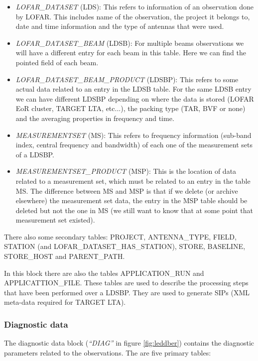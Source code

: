 \documentclass[a4paper,11pt]{article}
\begin{document}
\begin{itemize}
	\item \textit{LOFAR\_DATASET} (LDS): This refers to information of an observation done by LOFAR. This includes name of the observation, the project it belongs to, date and time information and the type of antennas that were used.
	
	\item \textit{LOFAR\_DATASET\_BEAM} (LDSB): For multiple beams observations we will have a different entry for each beam in this table. Here we can find the pointed field of each beam.
	
	\item \textit{LOFAR\_DATASET\_BEAM\_PRODUCT} (LDSBP): This refers to some actual data related to an entry in the LDSB table. For the same LDSB entry we can have different LDSBP depending on where the data is stored (LOFAR EoR cluster, TARGET LTA, etc...), the packing type (TAR, BVF or none) and the averaging properties in frequency and time.
	
	\item \textit{MEASUREMENTSET} (MS): This refers to frequency information (sub-band index, central frequency and bandwidth) of each one of the measurement sets of a LDSBP.
	
	\item \textit{MEASUREMENTSET\_PRODUCT} (MSP): This is the location of data related to a measurement set, which must be related to an entry in the table MS. The difference between MS and MSP is that if we delete (or archive elsewhere) the measurement set data, the entry in the MSP table should be deleted but not the one in MS (we still want to know that at some point that measurement set existed). 
\end{itemize}

There also some secondary tables: PROJECT, ANTENNA\_TYPE, FIELD, STATION (and LOFAR\_DATASET\_HAS\_STATION), STORE, BASELINE, STORE\_HOST and PARENT\_PATH.

In this block there are also the tables APPLICATION\_RUN and APPLICATTION\_FILE. These tables are used to describe the processing steps that have been performed over a LDSBP. They are used to generate SIPs (XML meta-data required for TARGET LTA).

\subsubsection{Diagnostic data}
\label{sec:diag}

The diagnostic data block (\textit{``DIAG''} in figure \ref{fig:leddber}) contains the diagnostic parameters related to the observations. The are five primary tables:
\end{document}
